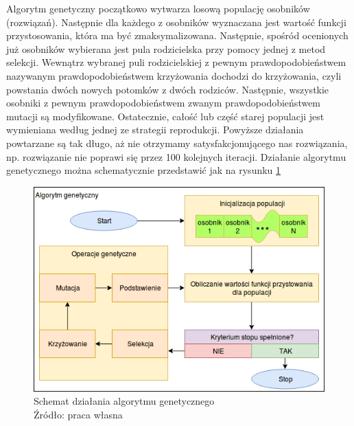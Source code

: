 Algorytm genetyczny początkowo wytwarza losową populację osobników (rozwiązań).
Następnie dla każdego z osobników wyznaczana jest wartość funkcji przystosowania, która ma być zmaksymalizowana.
Następnie, spośród ocenionych już osobników wybierana jest pula rodzicielska przy pomocy jednej z metod selekcji.
Wewnątrz wybranej puli rodzicielskiej z pewnym prawdopodobieństwem nazywanym prawdopodobieństwem krzyżowania dochodzi do krzyżowania, czyli powstania dwóch nowych potomków z dwóch rodziców.
Następnie, wszystkie osobniki z pewnym prawdopodobieństwem zwanym prawdopodobieństwem mutacji są modyfikowane.
Ostatecznie, całość lub część starej populacji jest wymieniana według jednej ze strategii reprodukcji.
Powyższe działania powtarzane są tak długo, aż nie otrzymamy satysfakcjonującego nas rozwiązania, np. rozwiązanie nie poprawi się przez 100 kolejnych iteracji.
Działanie algorytmu genetycznego można schematycznie przedstawić jak na rysunku \ref{fig:gen_schemat}

\begin{figure}[h!tb]
	 \centering
	 \includegraphics[width = 1.0\linewidth]{img/genetyczny_schemat}
	 \caption{Schemat działania algorytmu genetycznego \\
              Źródło: praca własna}
	 \label{fig:gen_schemat}
\end{figure}
